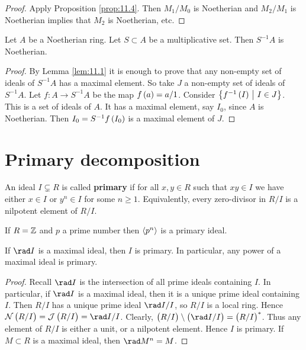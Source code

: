 \begin{proof}
Apply Proposition \ref{prop:11.4}. Then $ M_1 / M_0 $ is Noetherian and $ M_2 / M_1 $ is Noetherian implies that $ M_2 $ is Noetherian, etc.
\end{proof}

\begin{lemma}
Let $ A $ be a Noetherian ring. Let $ S \subset A $ be a multiplicative set. Then $ S^{-1}A $ is Noetherian.
\end{lemma}

\begin{proof}
By Lemma \ref{lem:11.1} it is enough to prove that any non-empty set of ideals of $ S^{-1}A $ has a maximal element. So take $ J $ a non-empty set of ideals of $ S^{-1}A $. Let $ f : A \to S^{-1}A $ be the map $ f\br{a} = a / 1 $. Consider $ \cbr{f^{-1}\br{I} \st I \in J} $. This is a set of ideals of $ A $. It has a maximal element, say $ I_0 $, since $ A $ is Noetherian. Then $ I_0 = S^{-1}f\br{I_0} $ is a maximal element of $ J $.
\end{proof}

\pagebreak

\section{Primary decomposition}

\begin{definition}
An ideal $ I \subsetneq R $ is called \textbf{primary} if for all $ x, y \in R $ such that $ xy \in I $ we have either $ x \in I $ or $ y^n \in I $ for some $ n \ge 1 $. Equivalently, every zero-divisor in $ R / I $ is a nilpotent element of $ R / I $.
\end{definition}

\begin{example*}
If $ R = \mathbb{Z} $ and $ p $ a prime number then $ \left\langle p^n \right\rangle $ is a primary ideal.
\end{example*}


\begin{proposition}
\label{prop:12.2}
If $ \rad I $ is a maximal ideal, then $ I $ is primary. In particular, any power of a maximal ideal is primary.
\end{proposition}

\begin{proof}
Recall $ \rad I $ is the intersection of all prime ideals containing $ I $. In particular, if $ \rad I $ is a maximal ideal, then it is a unique prime ideal containing $ I $. Then $ R / I $ has a unique prime ideal $ \rad I / I $, so $ R / I $ is a local ring. Hence $ \NNN\br{R / I} = \JJJ\br{R / I} = \rad I / I $. Clearly, $ \br{R / I} \setminus \br{\rad I / I} = \br{R / I}^* $. Thus any element of $ R / I $ is either a unit, or a nilpotent element. Hence $ I $ is primary. If $ M \subset R $ is a maximal ideal, then $ \rad M^n = M $.
\end{proof}

